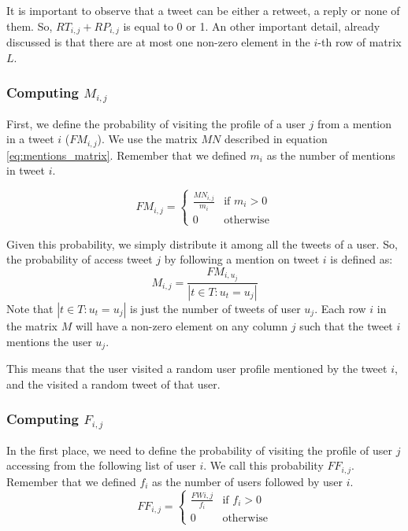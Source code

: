 \documentclass[12pt,a4paper]{article}
\begin{document}
It is important to observe that a tweet can be either a retweet, a reply or none of them. So, $RT_{i,j} + RP_{i,j}$ is equal to 0 or 1. An other important detail, already discussed is that there are at most one non-zero element in the $i$-th row of matrix $L$.

\subsubsection*{Computing $M_{i,j}$}
First, we define the probability of visiting the profile of a user $j$ from a mention in a tweet $i$ ($FM_{i,j}$). We use the matrix $MN$ described in equation \ref{eq:mentions_matrix}. Remember that we defined $m_i$ as the number of mentions in tweet $i$.

\begin{equation}
FM_{i,j} = \begin{cases}
\frac{MN_{i,j}}{m_i} & \text{if } m_i > 0 \\
0 & \text{otherwise}
\end{cases}
\end{equation}

Given this probability, we simply distribute it among all the tweets of a user. So, the probability of access tweet $j$ by following a mention on tweet $i$ is defined as:
\begin{equation}
M_{i,j} = \frac{FM_{i, u_j}}{ |t \in T : u_t = u_j|}
\end{equation}
Note that $|t \in T : u_t = u_j|$ is just the number of tweets of user $u_j$. Each row $i$ in the matrix $M$ will have a non-zero element on any column $j$ such that the tweet $i$ mentions the user $u_j$.

This means that the user visited a random user profile mentioned by the tweet $i$, and the visited a random tweet of that user. 

\subsubsection*{Computing $F_{i,j}$}
In the first place, we need to define the probability of visiting the profile of user $j$ accessing from the following list of user $i$. We call this probability $FF_{i,j}$. Remember that we defined $f_i$ as the number of users followed by user $i$.
\begin{equation}
FF_{i,j} = \begin{cases}
\frac{FW{i,j}}{f_i} & \text{if } f_i > 0 \\
0 & \text{otherwise}
\end{cases}
\end{equation}
\end{document}
